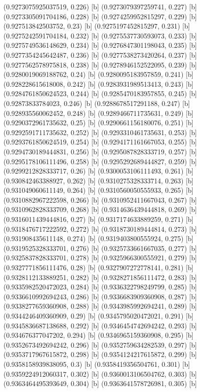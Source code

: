 {{{(0.9273075925037519, 0.226) [b] 
(0.9273079397259741, 0.227) [b] 
(0.9273305091704186, 0.228) [b] 
(0.9274259952815297, 0.229) [b] 
(0.927513842503752, 0.23) [b] 
(0.9275197452815297, 0.231) [b] 
(0.9275242591704184, 0.232) [b] 
(0.9275537730593073, 0.233) [b] 
(0.9275749536148629, 0.234) [b] 
(0.9276847301198043, 0.235) [b] 
(0.9277354245642487, 0.236) [b] 
(0.9277538273420264, 0.237) [b] 
(0.9277562578975818, 0.238) [b] 
(0.9278946152522095, 0.239) [b] 
(0.9280019069188762, 0.24) [b] 
(0.9280095183957859, 0.241) [b] 
(0.928228615618008, 0.242) [b] 
(0.9283931989513413, 0.243) [b] 
(0.9284761850624523, 0.244) [b] 
(0.9285470183957855, 0.245) [b] 
(0.92873833784023, 0.246) [b] 
(0.9288678517291188, 0.247) [b] 
(0.928935560062452, 0.248) [b] 
(0.9289466711735631, 0.249) [b] 
(0.9290372961735632, 0.25) [b] 
(0.9290661156180076, 0.251) [b] 
(0.9292591711735632, 0.252) [b] 
(0.9293310461735631, 0.253) [b] 
(0.9293761850624519, 0.254) [b] 
(0.9294171161667053, 0.255) [b] 
(0.9294730189444831, 0.256) [b] 
(0.9295087828333719, 0.257) [b] 
(0.9295178106111496, 0.258) [b] 
(0.9295292689444827, 0.259) [b] 
(0.9299212828333717, 0.26) [b] 
(0.9300053106111493, 0.261) [b] 
(0.930842463388927, 0.262) [b] 
(0.9310275328333714, 0.263) [b] 
(0.931049060611149, 0.264) [b] 
(0.9310560050555933, 0.265) [b] 
(0.9310882967222598, 0.266) [b] 
(0.9310952411667043, 0.267) [b] 
(0.9310962828333709, 0.268) [b] 
(0.9314636439444818, 0.269) [b] 
(0.9316011439444816, 0.27) [b] 
(0.9317174633889259, 0.271) [b] 
(0.9318476717222592, 0.272) [b] 
(0.9318730189444814, 0.273) [b] 
(0.931908435611148, 0.274) [b] 
(0.9319403800555924, 0.275) [b] 
(0.9319525328333701, 0.276) [b] 
(0.9325733661667035, 0.277) [b] 
(0.9325837828333701, 0.278) [b] 
(0.9325966300555921, 0.279) [b] 
(0.9327771856111476, 0.28) [b] 
(0.9327907272778141, 0.281) [b] 
(0.9328112133889251, 0.282) [b] 
(0.9328271856111472, 0.283) [b] 
(0.9335982520472023, 0.284) [b] 
(0.9336322798249799, 0.285) [b] 
(0.9336610992694243, 0.286) [b] 
(0.9336683909360908, 0.287) [b] 
(0.9338277659360908, 0.288) [b] 
(0.9343985992694241, 0.289) [b] 
(0.9344246409360909, 0.29) [b] 
(0.9345795020472021, 0.291) [b] 
(0.9345836687138688, 0.292) [b] 
(0.9346454742694242, 0.293) [b] 
(0.934676377047202, 0.294) [b] 
(0.9346965159360908, 0.295) [b] 
(0.9352673492694242, 0.296) [b] 
(0.9352759634282539, 0.297) [b] 
(0.9353717967615872, 0.298) [b] 
(0.9354124217615872, 0.299) [b] 
(0.9358158939838095, 0.3) [b] 
(0.9358419356504761, 0.301) [b] 
(0.9359224912060317, 0.302) [b] 
(0.9360013106504762, 0.303) [b] 
(0.9363464495393649, 0.304) [b] 
(0.9363641578726981, 0.305) [b] 
}}}
